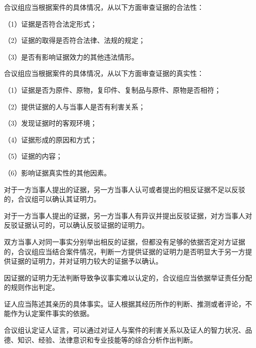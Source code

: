 合议组应当根据案件的具体情况，从以下方面审查证据的合法性：

{\setlength{\parindent}{17.1bp}（1）证据是否符合法定形式；\par}

{\setlength{\parindent}{17.1bp}（2）证据的取得是否符合法律、法规的规定；\par}

{\setlength{\parindent}{17.1bp}（3）是否有影响证据效力的其他违法情形。\par}

合议组应当根据案件的具体情况，从以下方面审查证据的真实性：

{\setlength{\parindent}{17.1bp}（1）证据是否为原件、原物，复印件、复制品与原件、原物是否相符；\par}

{\setlength{\parindent}{17.1bp}（2）提供证据的人与当事人是否有利害关系；\par}

{\setlength{\parindent}{17.1bp}（3）发现证据时的客观环境；\par}

{\setlength{\parindent}{17.1bp}（4）证据形成的原因和方式；\par}

{\setlength{\parindent}{17.1bp}（5）证据的内容；\par}

{\setlength{\parindent}{17.1bp}（6）影响证据真实性的其他因素。\par}

对于一方当事人提出的证据，另一方当事人认可或者提出的相反证据不足以反驳的，合议组可以确认其证明力。

对于一方当事人提出的证据，另一方当事人有异议并提出反驳证据，对方当事人对反驳证据认可的，可以确认反驳证据的证明力。

双方当事人对同一事实分别举出相反的证据，但都没有足够的依据否定对方证据的，合议组应当结合案件情况，判断一方提供证据的证明力是否明显大于另一方提供证据的证明力，并对证明力较大的证据予以确认。

因证据的证明力无法判断导致争议事实难以认定的，合议组应当依据举证责任分配的规则作出判定。

证人应当陈述其亲历的具体事实。证人根据其经历所作的判断、推测或者评论，不能作为认定案件事实的依据。

合议组认定证人证言，可以通过对证人与案件的利害关系以及证人的智力状况、品德、知识、经验、法律意识和专业技能等的综合分析作出判断。

